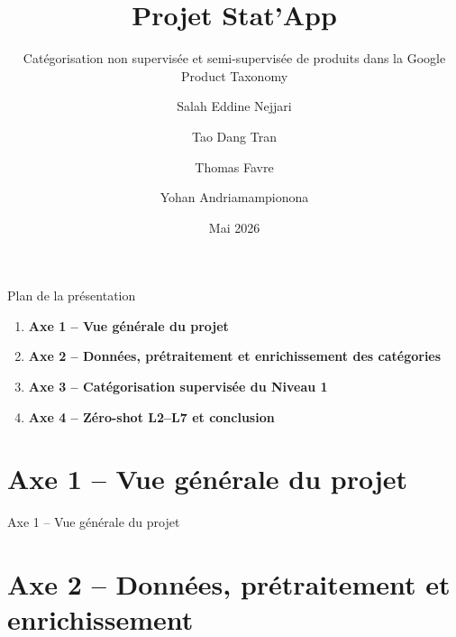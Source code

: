 \documentclass[11pt,aspectratio=169]{beamer}
\title[Stat'App -- Soutenance]{Projet Stat'App}
\subtitle{Catégorisation non supervisée et semi-supervisée de produits dans la Google Product Taxonomy}
\author{Salah Eddine Nejjari \and Tao Dang Tran \and Thomas Favre \and Yohan Andriamampionona}
\institute{ENSAE Paris -- Projet Stat'App}
\date{Mai 2026}
\begin{document}
\begin{frame}
    \titlepage
\end{frame}

\begin{frame}{Plan de la présentation}
\small
\begin{enumerate}
    \item \textbf{Axe 1 -- Vue générale du projet} 
    \item \textbf{Axe 2 -- Données, prétraitement et enrichissement des catégories}
    \item \textbf{Axe 3 -- Catégorisation supervisée du Niveau 1}
    \item \textbf{Axe 4 -- Zéro-shot L2--L7 et conclusion} 
\end{enumerate}

\vspace{0.4cm}

\end{frame}

\section{Axe 1 -- Vue générale du projet}

\begin{frame}{Axe 1 -- Vue générale du projet}
\centering
\end{frame}



\section{Axe 2 -- Données, prétraitement et enrichissement}
\end{document}
